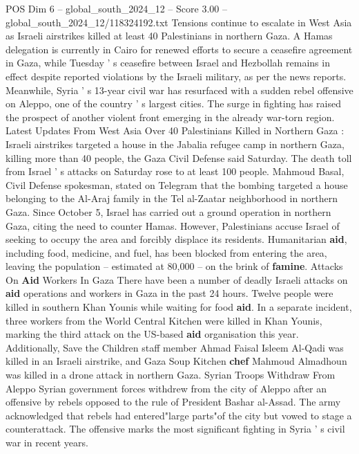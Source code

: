 \begin{textsample}{POS Dim 6 – global\_south\_2024\_12 – Score 3.00 – global\_south\_2024\_12/118324192.txt}  \label{ex:f6_pos_330}
Tensions continue to escalate in West Asia as Israeli airstrikes killed at least 40 Palestinians in northern Gaza.
A Hamas delegation is currently in Cairo for renewed efforts to secure a ceasefire agreement in Gaza, while Tuesday ' s ceasefire between Israel and Hezbollah remains in effect despite reported violations by the Israeli military, as per the news reports.
Meanwhile, Syria ' s 13-year civil war has resurfaced with a sudden rebel offensive on Aleppo, one of the country ' s largest cities.
The surge in fighting has raised the prospect of another violent front emerging in the already war-torn region.
Latest Updates From West Asia Over 40 Palestinians Killed in Northern Gaza : Israeli airstrikes targeted a house in the Jabalia refugee camp in northern Gaza, killing more than 40 people, the Gaza Civil Defense said Saturday.
The death toll from Israel ' s attacks on Saturday rose to at least 100 people.
Mahmoud Basal, Civil Defense spokesman, stated on Telegram that the bombing targeted a house belonging to the Al-Araj family in the Tel al-Zaatar neighborhood in northern Gaza.
Since October 5, Israel has carried out a ground operation in northern Gaza, citing the need to counter Hamas.
However, Palestinians accuse Israel of seeking to occupy the area and forcibly displace its residents.
Humanitarian \textbf{aid}, including food, medicine, and fuel, has been blocked from entering the area, leaving the population -- estimated at 80,000 -- on the brink of \textbf{famine}.
Attacks On \textbf{Aid} Workers In Gaza There have been a number of deadly Israeli attacks on \textbf{aid} operations and workers in Gaza in the past 24 hours.
Twelve people were killed in southern Khan Younis while waiting for food \textbf{aid}.
In a separate incident, three workers from the World Central Kitchen were killed in Khan Younis, marking the third attack on the US-based \textbf{aid} organisation this year.
Additionally, Save the Children staff member Ahmad Faisal Isleem Al-Qadi was killed in an Israeli airstrike, and Gaza Soup Kitchen \textbf{chef} Mahmoud Almadhoun was killed in a drone attack in northern Gaza.
Syrian Troops Withdraw From Aleppo Syrian government forces withdrew from the city of Aleppo after an offensive by rebels opposed to the rule of President Bashar al-Assad.
The army acknowledged that rebels had entered"large parts"of the city but vowed to stage a counterattack.
The offensive marks the most significant fighting in Syria ' s civil war in recent years.

\end{textsample}

